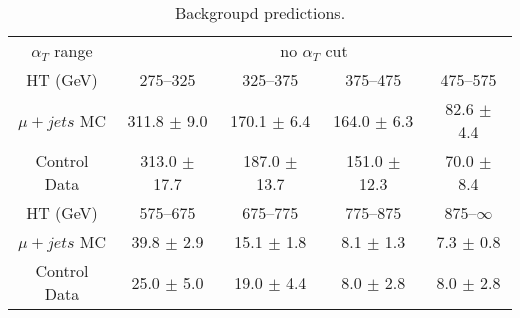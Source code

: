 \documentclass[a4paper,12pt]{article}
\begin{document}
 
\begin{table}[htl] 
\caption{Backgroupd predictions.}
 \begin{flushleft}
 \begin{tabular}{ c|cccc }
\hline
$ \alpha_T $ range   &  \multicolumn{4}{c}{no $\alpha_T$ cut}\\ 
  HT (GeV) & 275--325 & 325--375 & 375--475 & 475--575 \\ 
 $\mu + jets$ MC & 311.8 $\pm$ 9.0  & 170.1 $\pm$ 6.4  & 164.0 $\pm$ 6.3  & 82.6 $\pm$ 4.4 \\ 
Control Data & 313.0 $\pm$ 17.7  & 187.0 $\pm$ 13.7  & 151.0 $\pm$ 12.3  & 70.0 $\pm$ 8.4 \\ 
\hline
 HT (GeV) & 575--675 & 675--775 & 775--875 & 875--$\infty$ \\ 
 $\mu + jets$ MC & 39.8 $\pm$ 2.9  & 15.1 $\pm$ 1.8  & 8.1 $\pm$ 1.3  & 7.3 $\pm$ 0.8 \\ 
Control Data & 25.0 $\pm$ 5.0  & 19.0 $\pm$ 4.4  & 8.0 $\pm$ 2.8  & 8.0 $\pm$ 2.8 \\ 
\hline
 \end{tabular}
 \end{flushleft}
\label{tab:bg-esti-tauhad-1}
 \end{table}
\end{document}

